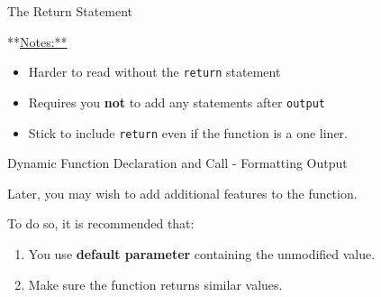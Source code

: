 \begin{frame}[fragile]{The Return Statement}

**\url{Notes:**}

\begin{itemize}
\tightlist
\item
  Harder to read without the \texttt{return} statement
\item
  Requires you \textbf{not} to add any statements after \texttt{output}
\item
  Stick to include \texttt{return} even if the function is a one liner.
\end{itemize}

\end{frame}

\begin{frame}[fragile]{Dynamic Function Declaration and Call -
Formatting Output}

Later, you may wish to add additional features to the function.

To do so, it is recommended that:

\begin{enumerate}
\def\labelenumi{\arabic{enumi}.}
\tightlist
\item
  You use \textbf{default parameter} containing the unmodified value.
\item
  Make sure the function returns similar values.
\end{enumerate}

\begin{Shaded}
\end{Shaded}

\end{frame}

